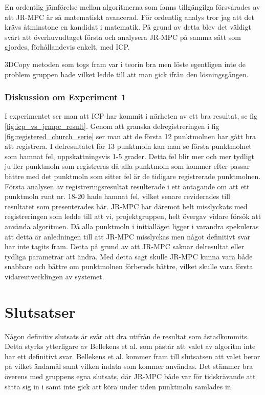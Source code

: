 En ordentlig jämförelse mellan algoritmerna som fanns tillgängilga försvårades av att JR-MPC är så matematiskt avancerad. För ordentlig analys tror jag att det krävs åtminstone en kandidat i matematik. På grund av detta blev det väldigt svårt att överhuvudtaget förstå och analysera JR-MPC på samma sätt som gjordes, förhållandevis enkelt, med ICP. 

3DCopy metoden som togs fram var i teorin bra men löste egentligen inte de problem gruppen hade vilket ledde till att man gick ifrån den lösningsgången. 

\subsubsection{Diskussion om Experiment 1}

I experimentet ser man att ICP har kommit i närheten av ett bra resultat, se fig \ref{fig:icp_vs_jrmpc_result}. Genom att granska delregistreringen i fig \ref{fig:registered_church_serie} ser man att de första 12 punktmolnen har gått bra att registrera. I delresultatet för 13 punktmoln kan man se första punktmolnet som hamnat fel, uppskattningsvis 1-5 grader. Detta fel blir mer och mer tydligt ju fler punktmoln som registreras då alla punktmoln som kommer efter passar bättre med det punktmoln som sitter fel är de tidigare registrerade punktmolnen. Första analysen av registreringsresultat resulterade i ett antagande om att ett punktmoln runt nr. 18-20 hade hamnat fel, vilket senare reviderades till resultatet som presenterades här.
JR-MPC har däremot helt misslyckats med registreringen som ledde till att vi, projektgruppen, helt övergav vidare försök att använda algoritmen. Då alla punktmoln i initialläget ligger i varandra spekuleras att detta är anledningen till att JR-MPC misslyckas men något definitivt svar har inte tagits fram. Detta på grund av att JR-MPC saknar delresultat eller tydliga parametrar att ändra. Med detta sagt skulle JR-MPC kunna vara både snabbare och bättre om punktmolnen förbereds bättre, vilket skulle vara första vidareutvecklingen av systemet.

\section{Slutsatser}
\label{sec:conclusions-karlsson}

Någon definitiv slutsats är svår att dra utifrån de resultat som åstadkommits. Detta styrks ytterligare av Bellekens et al. \cite{registration_comparing} som påstår att valet av algoritm inte har ett definitivt svar. Bellekens et al. kommer fram till slutsatsen att valet beror på vilket ändamål samt vilken indata som kommer användas. Det stämmer bra överens med gruppens egna slutsats, där JR-MPC både var för tidskrävande att sätta sig in i samt inte gick att köra under tiden punktmoln samlades in.

